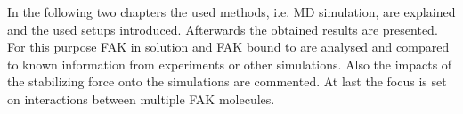 %
%
%
In the following two chapters the used methods, i.e. MD simulation, are explained and the used setups introduced. Afterwards the obtained results are presented. For this purpose FAK in solution and FAK bound to \pip{} are analysed and compared to known information from experiments or other simulations. Also the impacts of the stabilizing force onto the simulations are commented. At last the focus is set on interactions between multiple FAK molecules.

